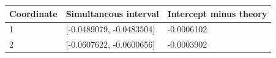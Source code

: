 \begin{tabular}{lll}
Coordinate & Simultaneous interval & Intercept minus theory \\
\hline
1 & [-0.0489079, -0.0483504] & -0.0006102 \\
2 & [-0.0607622, -0.0600656] & -0.0003902 \\
\end{tabular}
